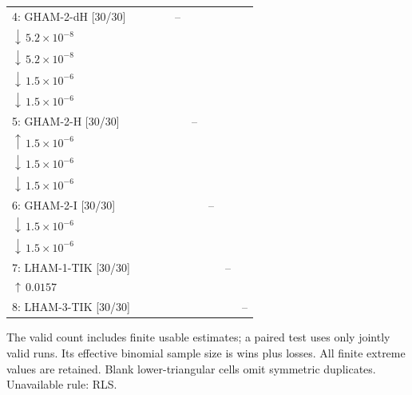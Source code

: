 \begin{table}[!htbp]
{\begin{tabular}{@{}l*{8}{c}@{}}
4: GHAM-2-dH [30/30] &  &  &  & -- & \shortstack{$0{:}30{:}0$\\$\downarrow\,5.2\!\times\!10^{-8}$} & \shortstack{$0{:}30{:}0$\\$\downarrow\,5.2\!\times\!10^{-8}$} & \shortstack{$1{:}29{:}0$\\$\downarrow\,1.5\!\times\!10^{-6}$} & \shortstack{$1{:}29{:}0$\\$\downarrow\,1.5\!\times\!10^{-6}$} \\
5: GHAM-2-H [30/30] &  &  &  &  & -- & \shortstack{$29{:}1{:}0$\\$\uparrow\,1.5\!\times\!10^{-6}$} & \shortstack{$1{:}29{:}0$\\$\downarrow\,1.5\!\times\!10^{-6}$} & \shortstack{$1{:}29{:}0$\\$\downarrow\,1.5\!\times\!10^{-6}$} \\
6: GHAM-2-I [30/30] &  &  &  &  &  & -- & \shortstack{$1{:}29{:}0$\\$\downarrow\,1.5\!\times\!10^{-6}$} & \shortstack{$1{:}29{:}0$\\$\downarrow\,1.5\!\times\!10^{-6}$} \\
7: LHAM-1-TIK [30/30] &  &  &  &  &  &  & -- & \shortstack{$23{:}7{:}0$\\$\uparrow\,0.0157$} \\
8: LHAM-3-TIK [30/30] &  &  &  &  &  &  &  & -- \\
\bottomrule
\end{tabular}%
}
\endgroup
\par\smallskip
\begin{minipage}{\linewidth}\footnotesize
The valid count includes finite usable estimates; a paired test uses only jointly valid runs. Its effective binomial sample size is wins plus losses. All finite extreme values are retained. Blank lower-triangular cells omit symmetric duplicates.
Unavailable rule: RLS.
\end{minipage}
\end{table}


